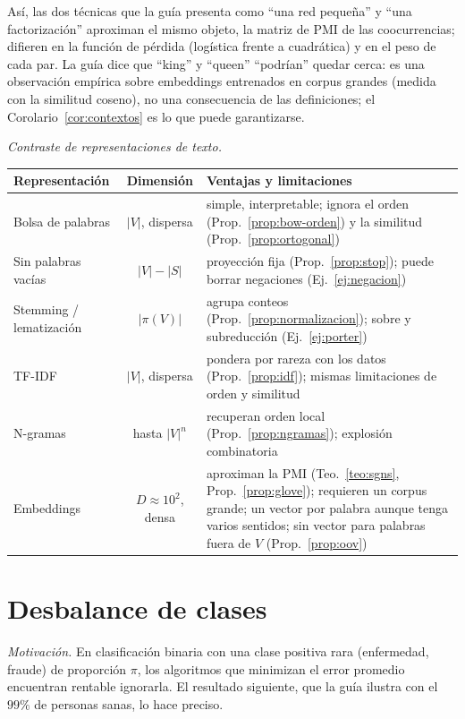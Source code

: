 \documentclass[11pt]{article}
\theoremstyle{definition}
\theoremstyle{remark}
\newcommand{\abs}[1]{\left\lvert #1\right\rvert}
\begin{document}
\noindent Así, las dos técnicas que la guía presenta como ``una red pequeña'' y ``una factorización'' aproximan el mismo objeto, la matriz de PMI de las coocurrencias; difieren en la función de pérdida (logística frente a cuadrática) y en el peso de cada par. La guía dice que ``king'' y ``queen'' ``podrían'' quedar cerca: es una observación empírica sobre embeddings entrenados en corpus grandes (medida con la similitud coseno), no una consecuencia de las definiciones; el Corolario~\ref{cor:contextos} es lo que puede garantizarse.

\medskip

\noindent \emph{Contraste de representaciones de texto.}
\begin{center}
\begin{tabularx}{\linewidth}{@{}lcY@{}}
\toprule
Representación & Dimensión & Ventajas y limitaciones\\
\midrule
Bolsa de palabras & $\abs V$, dispersa & simple, interpretable; ignora el orden (Prop.~\ref{prop:bow-orden}) y la similitud (Prop.~\ref{prop:ortogonal})\\
Sin palabras vacías & $\abs V-\abs S$ & proyección fija (Prop.~\ref{prop:stop}); puede borrar negaciones (Ej.~\ref{ej:negacion})\\
Stemming / lematización & $\abs{\pi(V)}$ & agrupa conteos (Prop.~\ref{prop:normalizacion}); sobre y subreducción (Ej.~\ref{ej:porter})\\
TF-IDF & $\abs V$, dispersa & pondera por rareza con los datos (Prop.~\ref{prop:idf}); mismas limitaciones de orden y similitud\\
N-gramas & hasta $\abs V^n$ & recuperan orden local (Prop.~\ref{prop:ngramas}); explosión combinatoria\\
Embeddings & $D\approx10^2$, densa & aproximan la PMI (Teo.~\ref{teo:sgns}, Prop.~\ref{prop:glove}); requieren un corpus grande; un vector por palabra aunque tenga varios sentidos; sin vector para palabras fuera de $V$ (Prop.~\ref{prop:oov})\\
\bottomrule
\end{tabularx}
\end{center}

\section{Desbalance de clases}\label{sec:desbalance}

\noindent \emph{Motivación.} En clasificación binaria con una clase positiva rara (enfermedad, fraude) de proporción $\pi$, los algoritmos que minimizan el error promedio encuentran rentable ignorarla. El resultado siguiente, que la guía ilustra con el $99\%$ de personas sanas, lo hace preciso.
\end{document}
